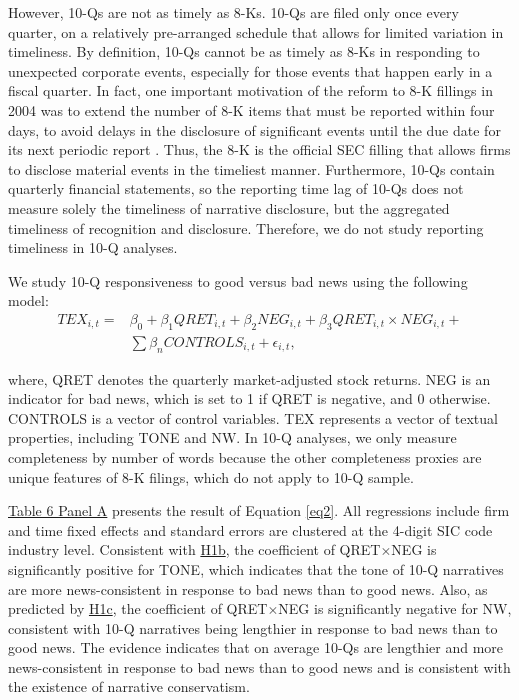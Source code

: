 \documentclass[letterpaper,12pt]{article}
\begin{document}
\begin{spacing}{1.5}
However, 10-Qs are not as timely as 8-Ks. 10-Qs are filed only once every quarter, on a relatively pre-arranged schedule that allows for limited variation in timeliness. By definition, 10-Qs cannot be as timely as 8-Ks in responding to unexpected corporate events, especially for those events that happen early in a fiscal quarter. In fact, one important motivation of the reform to 8-K fillings in 2004 was to extend the number of 8-K items that must be reported within four days, to avoid delays in the disclosure of significant events until the due date for its next periodic report \cite{secFinalRuleAdditional2004}. Thus, the 8-K is the official SEC filling that allows firms to disclose material events in the timeliest manner. Furthermore, 10-Qs contain quarterly financial statements, so the reporting time lag of 10-Qs does not measure solely the timeliness of narrative disclosure, but the aggregated timeliness of recognition and disclosure. Therefore, we do not study reporting timeliness in 10-Q analyses. 

We study 10-Q responsiveness to good versus bad news using the following model: 
\begin{equation}
	\begin{aligned} 
		\label{eq2}
		TEX_{i,t}=
		&\beta_0+\beta_1QRET_{i,t}+\beta_2NEG_{i,t}+\beta_3QRET_{i,t}\times NEG_{i,t}+\\
		&\sum\beta_nCONTROLS_{i,t}+\epsilon_{i,t},
	\end{aligned} 
\end{equation}

\noindent where, QRET denotes the quarterly market-adjusted stock returns. NEG is an indicator for bad news, which is set to 1 if QRET is negative, and 0 otherwise. CONTROLS is a vector of control variables. TEX represents a vector of textual properties, including TONE and NW. In 10-Q analyses, we only measure completeness by number of words because the other completeness proxies are unique features of 8-K filings, which do not apply to 10-Q sample.  

\hyperref[T6PA]{Table 6 Panel A} presents the result of Equation \eqref{eq2}. All regressions include firm and time fixed effects and standard errors are clustered at the 4-digit SIC code industry level. Consistent with \hyperref[hyp:h1b]{H1b}, the coefficient of QRET$\times$NEG is significantly positive for TONE, which indicates that the tone of 10-Q narratives are more news-consistent in response to bad news than to good news. Also, as predicted by \hyperref[hyp:h1c]{H1c}, the coefficient of QRET$\times$NEG is significantly negative for NW, consistent with 10-Q narratives being lengthier in response to bad news than to good news. The evidence indicates that on average 10-Qs are lengthier and more news-consistent in response to bad news than to good news and is consistent with the existence of narrative conservatism.


\end{spacing}
\end{document}

